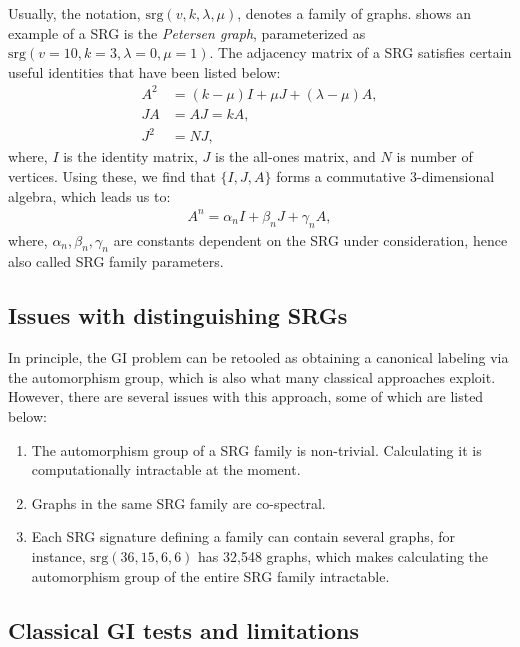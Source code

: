 \documentclass[twocolumn,a4paper,english,10pt]{article}
\begin{document}
Usually, the notation, $\text{srg}(v, k, \lambda, \mu)$, denotes a family of graphs. 
 shows an example of a SRG is the \textit{Petersen graph}, parameterized as $\text{srg}(v=10, k=3, \lambda=0, \mu=1)$. 
The adjacency matrix of a SRG satisfies certain useful identities that have been listed below:
\begin{align*}
    A^2 &= (k - \mu)I + \mu J + (\lambda - \mu)A, \\
    JA &= AJ = kA, \\
    J^2 &= NJ,
\end{align*}
where, $I$ is the identity matrix, $J$ is the all-ones matrix, and $N$ is number of vertices. 
Using these, we find that $\{I, J, A\}$ forms a commutative 3-dimensional algebra, which leads us to:
\begin{align*}
    A^n = \alpha_n I + \beta_n J + \gamma_n A,
\end{align*}
where, $\alpha_n, \beta_n, \gamma_n$ are constants dependent on the SRG under consideration, hence also called SRG family parameters.

\subsection{Issues with distinguishing SRGs}
In principle, the GI problem can be retooled as obtaining a canonical labeling via
the automorphism group, which is also what many classical approaches exploit. However, there are several 
issues with this approach, some of which are listed below:
\begin{enumerate}
    \item The automorphism group of a SRG family is non-trivial. Calculating it is computationally 
    intractable at the moment.
    \item Graphs in the same SRG family are co-spectral.
    \item Each SRG signature defining a family can contain several graphs, for instance,
    $\text{srg}(36, 15, 6, 6)$ has 32,548 graphs, which makes calculating the
    automorphism group of the entire SRG family intractable.
\end{enumerate}

\subsection{Classical GI tests and limitations}
\end{document}
